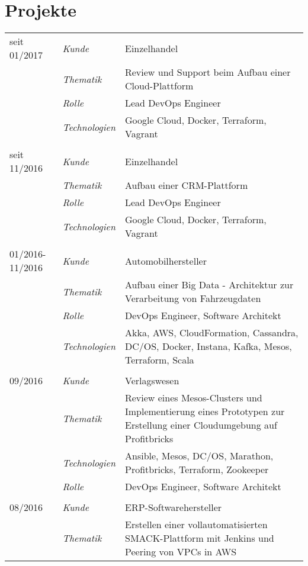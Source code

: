 \section*{Projekte}
\renewcommand{\arraystretch}{1.3}
\begin{longtable}{@{}>{}p{4cm}>{\itshape}p{2cm}>{}p{9cm}}
seit 01/2017        & Kunde 	    & Einzelhandel\\
\nopagebreak		& Thematik	    & Review und Support beim Aufbau einer Cloud-Plattform\\
\nopagebreak		& Rolle 	    & Lead DevOps Engineer\\
\nopagebreak		& Technologien	& Google Cloud, Docker, Terraform, Vagrant\\
\\
seit 11/2016        & Kunde 	    & Einzelhandel\\
\nopagebreak		& Thematik	    & Aufbau einer CRM-Plattform\\
\nopagebreak		& Rolle 	    & Lead DevOps Engineer\\
\nopagebreak		& Technologien	& Google Cloud, Docker, Terraform, Vagrant\\
\\
01/2016-11/2016     & Kunde 	    & Automobilhersteller\\
\nopagebreak		& Thematik	    & Aufbau einer Big Data - Architektur zur Verarbeitung von Fahrzeugdaten\\
\nopagebreak		& Rolle 	    & DevOps Engineer, Software Architekt\\
\nopagebreak		& Technologien	& Akka, AWS, CloudFormation, Cassandra, DC/OS, Docker, Instana, Kafka, Mesos, Terraform, Scala\\
\\
09/2016             & Kunde 	    & Verlagswesen\\
\nopagebreak		& Thematik	    & Review eines Mesos-Clusters und Implementierung eines Prototypen zur Erstellung einer Cloudumgebung auf Profitbricks\\
\nopagebreak		& Technologien	& Ansible, Mesos, DC/OS, Marathon, Profitbricks, Terraform, Zookeeper\\
\nopagebreak		& Rolle 	    & DevOps Engineer, Software Architekt\\
\\
08/2016             & Kunde 	    & ERP-Softwarehersteller\\
\nopagebreak		& Thematik	    & Erstellen einer vollautomatisierten SMACK-Plattform mit Jenkins und Peering von VPCs in AWS\\

\end{longtable}
